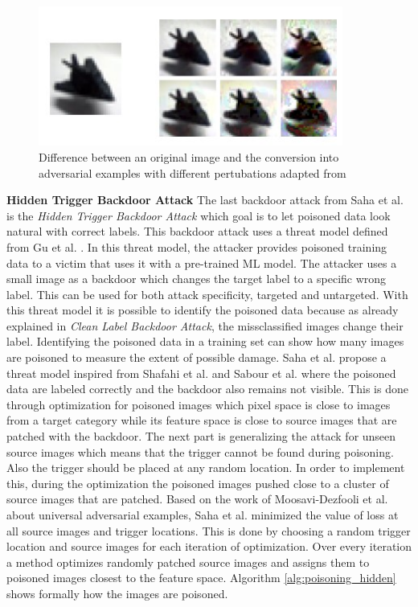 \begin{figure}[ht!]
  \centering
  \includegraphics[width=10cm]{pictures/poisoned_clean_label.jpg}
  \caption{Difference between an original image and the conversion into adversarial examples with different pertubations adapted from \cite{turner2018clean}}
  \label{fig:poisoned_clean_label}
\end{figure}

\textbf{Hidden Trigger Backdoor Attack} The last backdoor attack from Saha et al. \cite{DBLP:journals/corr/abs-1910-00033} is the \textit{Hidden Trigger Backdoor Attack} which goal is to let poisoned data look natural with correct labels. This backdoor attack uses a threat model defined from Gu et al. \cite{DBLP:journals/corr/abs-1708-06733}. In this threat model, the attacker provides poisoned training data to a victim that uses it with a pre-trained ML model. The attacker uses a small image as a backdoor which changes the target label to a specific wrong label. This can be used for both attack specificity, targeted and untargeted. With this threat model it is possible to identify the poisoned data because as already explained in \textit{Clean Label Backdoor Attack}, the missclassified images change their label. Identifying the poisoned data in a training set can show how many images are poisoned to measure the extent of possible damage. Saha et al. propose a threat model inspired from Shafahi et al. \cite{DBLP:journals/corr/abs-1804-00792} and Sabour et al. \cite{DBLP:journals/corr/SabourCFF15} where the poisoned data are labeled correctly and the backdoor also remains not visible. This is done through optimization for poisoned images which pixel space is close to images from a target category while its feature space is close to source images that are patched with the backdoor. The next part is generalizing the attack for unseen source images which means that the trigger cannot be found during poisoning. Also the trigger should be placed at any random location. In order to implement this, during the optimization the poisoned images pushed close to a cluster of source images that are patched. Based on the work of Moosavi-Dezfooli et al. \cite{DBLP:conf/cvpr/Moosavi-Dezfooli17} about universal adversarial examples, Saha et al. minimized the value of loss at all source images and trigger locations. This is done by choosing a random trigger location and source images for each
iteration of optimization. Over every iteration a method optimizes randomly patched source images and assigns them to poisoned images closest to the feature space. Algorithm \ref{alg:poisoning_hidden} shows formally how the images are poisoned.

